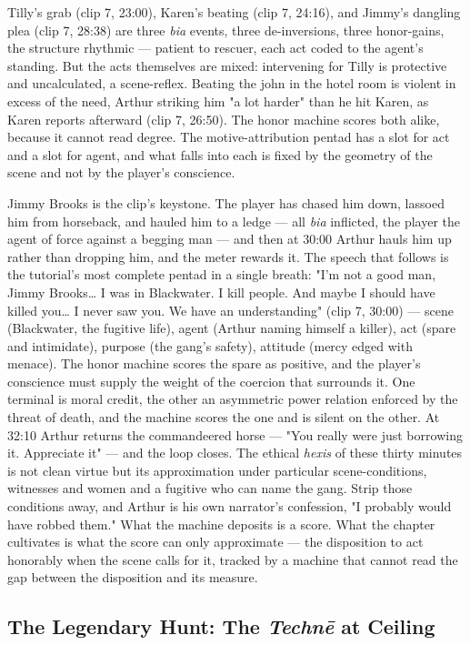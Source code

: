 \documentclass{article}
\begin{document}
Tilly's grab (clip 7, 23:00), Karen's beating (clip 7, 24:16), and Jimmy's dangling plea (clip 7, 28:38) are three \textit{bia} events, three de-inversions, three honor-gains, the structure rhythmic — patient to rescuer, each act coded to the agent's standing. But the acts themselves are mixed: intervening for Tilly is protective and uncalculated, a scene-reflex. Beating the john in the hotel room is violent in excess of the need, Arthur striking him "a lot harder" than he hit Karen, as Karen reports afterward (clip 7, 26:50). The honor machine scores both alike, because it cannot read degree. The motive-attribution pentad has a slot for act and a slot for agent, and what falls into each is fixed by the geometry of the scene and not by the player's conscience.

Jimmy Brooks is the clip's keystone. The player has chased him down, lassoed him from horseback, and hauled him to a ledge — all \textit{bia} inflicted, the player the agent of force against a begging man — and then at 30:00 Arthur hauls him up rather than dropping him, and the meter rewards it. The speech that follows is the tutorial's most complete pentad in a single breath: "I'm not a good man, Jimmy Brooks… I was in Blackwater. I kill people. And maybe I should have killed you… I never saw you. We have an understanding" (clip 7, 30:00) — scene (Blackwater, the fugitive life), agent (Arthur naming himself a killer), act (spare and intimidate), purpose (the gang's safety), attitude (mercy edged with menace). The honor machine scores the spare as positive, and the player's conscience must supply the weight of the coercion that surrounds it. One terminal is moral credit, the other an asymmetric power relation enforced by the threat of death, and the machine scores the one and is silent on the other. At 32:10 Arthur returns the commandeered horse — "You really were just borrowing it. Appreciate it" — and the loop closes. The ethical \textit{hexis} of these thirty minutes is not clean virtue but its approximation under particular scene-conditions, witnesses and women and a fugitive who can name the gang. Strip those conditions away, and Arthur is his own narrator's confession, "I probably would have robbed them." What the machine deposits is a score. What the chapter cultivates is what the score can only approximate — the disposition to act honorably when the scene calls for it, tracked by a machine that cannot read the gap between the disposition and its measure.

\bigskip

\subsection*{The Legendary Hunt: The \textit{Technē} at Ceiling}
\end{document}
